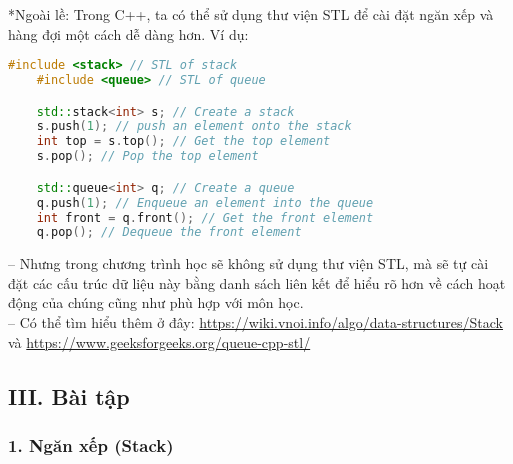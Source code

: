 \vspace{-6em}
\textcolor{UMTRed}{*Ngoài lề:} Trong C++, ta có thể sử dụng thư viện STL để cài đặt ngăn xếp và hàng đợi một cách dễ dàng hơn. Ví dụ:
\begin{lstlisting}[language=C++]
    #include <stack> // STL of stack
    #include <queue> // STL of queue

    std::stack<int> s; // Create a stack
    s.push(1); // push an element onto the stack
    int top = s.top(); // Get the top element
    s.pop(); // Pop the top element

    std::queue<int> q; // Create a queue
    q.push(1); // Enqueue an element into the queue
    int front = q.front(); // Get the front element
    q.pop(); // Dequeue the front element
\end{lstlisting}
\vspace{-3em}
-- Nhưng trong chương trình học sẽ không sử dụng thư viện STL, mà sẽ tự cài đặt các cấu trúc dữ liệu này bằng danh sách liên kết để hiểu rõ hơn về cách hoạt động của chúng cũng như phù hợp với môn học.\\
-- Có thể tìm hiểu thêm ở đây: \url{https://wiki.vnoi.info/algo/data-structures/Stack} và \url{https://www.geeksforgeeks.org/queue-cpp-stl/}
\subsection*{III. Bài tập}
\subsubsection*{1. Ngăn xếp (Stack)}
